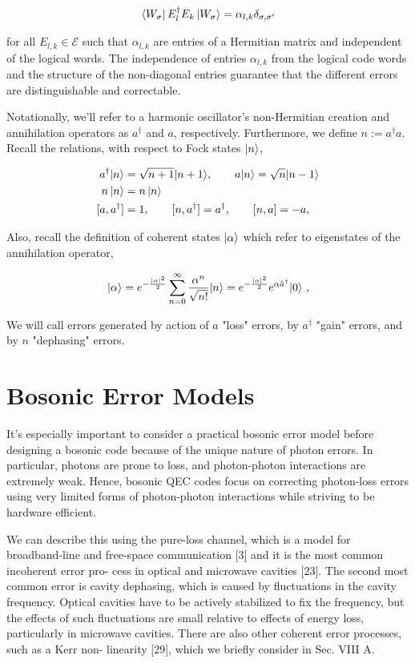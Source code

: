 \documentclass[12]{amsart}
\newcommand\0{\mathbf{0}}
\newcommand\<{\langle}
\renewcommand\>{\rangle}
\begin{document}
\begin{align}
\label{eq:k-l}
\bra{W_\sigma} E_l^\dag E_k \ket{W_\sigma} = \alpha_{l, k} \delta_{\sigma, \sigma'}	
\end{align}

for all $E_{l,k} \in \mathcal{E}$ such that $\alpha_{l,k}$ are entries of a Hermitian matrix and independent of the logical words. The independence of entries $\alpha_{l,k}$ from the logical code words and the structure of the non-diagonal entries guarantee that the different errors are distinguishable and correctable.

Notationally, we'll refer to a harmonic oscillator's non-Hermitian creation and annihilation operators as $a^\dag$ and $a$, respectively. Furthermore, we define $n := a^{\dag }a$. Recall the relations, with respect to Fock states $\ket{n}$,

\begin{align*}
a^{\dagger }|n\rangle &={\sqrt {n+1}}|n+1\rangle, \qquad a|n\rangle={\sqrt {n}}|n-1\rangle \\
n\ket{n} &= n\ket{n} \\
[a,a^{\dag }]&=1, \qquad[n,a^{\dag }]=a^{\dag }, \qquad[n,a]=-a,
\end{align*}

Also, recall the definition of coherent states $\ket{\alpha}$ which refer to eigenstates of the annihilation operator,

$$
|\alpha\rangle =e^{-{|\alpha|^2\over2}}\sum_{n=0}^{\infty}{\alpha^n\over\sqrt{n!}}|n\rangle =e^{-{|\alpha|^2\over2}}e^{\alpha\hat a^\dagger}|0\rangle ~,
$$

We will call errors generated by action of $a$ "loss" errors, by $a^\dag$ "gain" errors, and by $n$ "dephasing" errors. 

\section{Bosonic Error Models}

It's especially important to consider a practical bosonic error model before designing a bosonic code because of the unique nature of photon errors. In particular, photons are prone to loss, and photon-photon interactions are extremely weak. Hence, bosonic QEC codes focus on correcting photon-loss errors using very limited forms of photon-photon interactions while striving to be hardware efficient\cite{niu2018hardware}. 

We can describe this using the pure-loss channel, which is a model for broadband-line and free-space communication [3] and it is the most common incoherent error pro- cess in optical and microwave cavities [23]. The second most common error is cavity dephasing, which is caused by fluctuations in the cavity frequency. Optical cavities have to be actively stabilized to fix the frequency, but the effects of such fluctuations are small relative to effects of energy loss, particularly in microwave cavities. There are also other coherent error processes, such as a Kerr non- linearity [29], which we briefly consider in Sec. VIII A.
\end{document}
